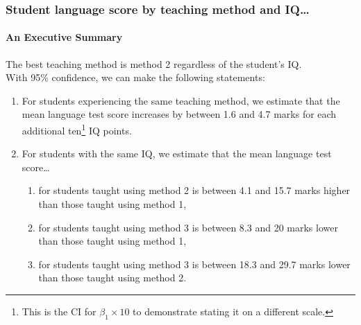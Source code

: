 \documentclass{beamer}\usepackage[]{graphicx}\usepackage[]{xcolor}
\makeatletter
\newcommand{\hlstr}[1]{\textcolor[rgb]{0.192,0.494,0.8}{#1}}%
\newcommand{\hlopt}[1]{\textcolor[rgb]{0,0,0}{#1}}%
\newcommand{\hlstd}[1]{\textcolor[rgb]{0.345,0.345,0.345}{#1}}%
\newcommand{\hlkwb}[1]{\textcolor[rgb]{0.69,0.353,0.396}{#1}}%
\newcommand{\hlkwc}[1]{\textcolor[rgb]{0.333,0.667,0.333}{#1}}%
\newcommand{\hlkwd}[1]{\textcolor[rgb]{0.737,0.353,0.396}{\textbf{#1}}}%
\newenvironment{kframe}{%
 \def\at@end@of@kframe{}%
 \ifinner\ifhmode%
  \def\at@end@of@kframe{\end{minipage}}%
  \begin{minipage}{\columnwidth}%
 \fi\fi%
 \def\FrameCommand##1{\hskip\@totalleftmargin \hskip-\fboxsep
 \colorbox{shadecolor}{##1}\hskip-\fboxsep
     \hskip-\linewidth \hskip-\@totalleftmargin \hskip\columnwidth}%
 \MakeFramed {\advance\hsize-\width
   \@totalleftmargin\z@ \linewidth\hsize
   \@setminipage}}%
 {\par\unskip\endMakeFramed%
 \at@end@of@kframe}
\newenvironment{knitrout}{}{} %
\makeatother
\begin{document}
\begin{frame}[fragile]
\frametitle{Student language score by  teaching method and IQ\ldots}
\framesubtitle{An Executive Summary}

The best teaching method is method 2 regardless of the student's IQ. \\
\medskip
With 95\% confidence, we can make the following statements:
\begin{enumerate}[1.]
\item For students experiencing the same teaching method, we estimate that the mean language test score increases by between 1.6 and 4.7 marks for each additional ten\footnote{This is the CI for $\beta_1\times 10$ to demonstrate stating it on a different scale.} IQ points.

\item For students with the same IQ, we estimate that the mean language test score\ldots
\begin{enumerate}[$\triangleright$]
\item for students taught using method 2 is between 4.1 and 15.7 marks higher than those taught using method 1, 
\item for students taught using method 3 is between 8.3 and 20 marks lower than those taught using method 1, 
\item for students taught using method 3 is between 18.3 and 29.7 marks lower than those taught using method 2.
\end{enumerate}
\end{enumerate}
\end{frame}




\end{document}
